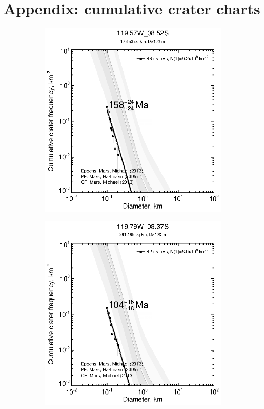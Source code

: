 \documentclass[12pt,letter]{article}
\begin{document}
\section{Appendix: cumulative crater charts}\label{sec_cccharts}
\begin{figure}[h]
\centering
\begin{subfigure}{.33\textwidth}
  \includegraphics[width=\linewidth,clip,trim=1cm 1cm 1.5cm 1cm]{figures/craterstats/119-57W_08-52S_100m_cum.eps}
\end{subfigure}%
\begin{subfigure}{.33\textwidth}
  \includegraphics[width=\linewidth,clip,trim=1cm 1cm 1.5cm 1cm]{figures/craterstats/119-79W_08-37S_100m_cum.eps}

\end{subfigure}
\end{figure}
\end{document}
